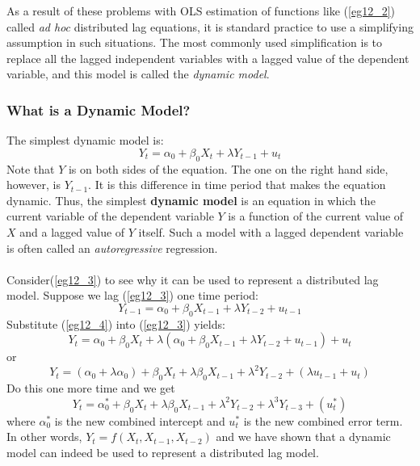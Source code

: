 \documentclass[11pt]{article}
\begin{document}
As a result of these problems with OLS estimation of functions like (\ref{eg12_2}) called \textit{ad hoc} distributed lag equations, it is standard practice to use a simplifying assumption in such situations. The most commonly used simplification is to replace all the lagged independent variables with a lagged value of the dependent variable, and this model is called the \textit{dynamic model}.
\subsubsection{What is a Dynamic Model?}
The simplest dynamic model is:
\begin{equation}
Y_t = \alpha_0 + \beta_0X_t + \lambda Y_{t-1} + u_t \label{eg12_3}
\end{equation}
Note that $Y$ is on both sides of the equation. The one on the right hand side, however, is $Y_{t-1}$. It is this difference in time period that makes the equation dynamic. Thus, the simplest \textbf{dynamic model} is an equation in which the current variable of the dependent variable $Y$ is a function of the current value of $X$ and a lagged value of $Y$ itself. Such a model with a lagged dependent variable is often called an \textit{autoregressive} regression.\\ \\
Consider(\ref{eg12_3}) to see why it can be used to represent a distributed lag model. Suppose we lag (\ref{eg12_3}) one time period:
\begin{equation}
Y_{t-1} = \alpha_0 + \beta_0X_{t-1} + \lambda Y_{t-2} + u_{t-1} \label{eg12_4}
\end{equation}
Substitute (\ref{eg12_4}) into (\ref{eg12_3}) yields:
\begin{equation}
Y_t = \alpha_0 + \beta_0X_t + \lambda (\alpha_0 + \beta_0X_{t-1} + \lambda Y_{t-2} + u_{t-1}) + u_t \label{eg12_5}
\end{equation}
or 
\begin{equation}
Y_t = (\alpha_0 + \lambda\alpha_0) + \beta_0X_t + \lambda\beta_0X_{t-1} + \lambda^2 Y_{t-2} + (\lambda u_{t-1} + u_t) \label{eg12_6}
\end{equation}
Do this one more time and we get
\begin{equation}
Y_t = \alpha_0^* + \beta_0X_t + \lambda\beta_0X_{t-1} + \lambda^2 Y_{t-2} +\lambda^3 Y_{t-3} + (u_t^*) \label{eg12_7}
\end{equation}
where $\alpha_0^*$ is the new combined intercept and $u_t^*$ is the new combined error term. In other words, $Y_t = f(X_t, X_{t-1}, X_{t-2})$ and we have shown that a dynamic model can indeed be used to represent a distributed lag model.\\ \\
\end{document}
